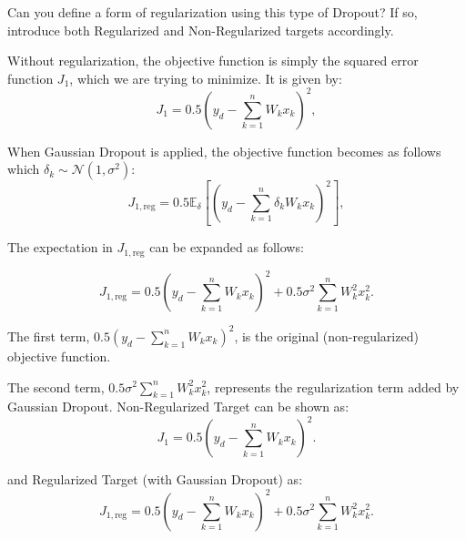 Can you define a form of regularization using this type of Dropout? If so, introduce both Regularized and Non-Regularized targets accordingly.
\begin{qsolve}
	\begin{qsolve}[]
		Without regularization, the objective function is simply the squared error function \( J_1 \), which we are trying to minimize. It is given by:
		\[
		J_1 = 0.5 \left( y_d - \sum_{k=1}^n W_k x_k \right)^2,
		\]
		
		When Gaussian Dropout is applied, the objective function becomes as follows which $\delta_k \sim \mathcal{N}(1, \sigma^2)$: 
		\[
		J_{1,\text{reg}} = 0.5 \mathbb{E}_{\delta} \left[ \left( y_d - \sum_{k=1}^n \delta_k W_k x_k \right)^2 \right],
		\]

		The expectation in \( J_{1,\text{reg}} \) can be expanded as follows:

		\[
		J_{1,\text{reg}} = 0.5 \left( y_d - \sum_{k=1}^n W_k x_k \right)^2 + 0.5 \sigma^2 \sum_{k=1}^n W_k^2 x_k^2.
		\]

		
		The first term, \( 0.5 \left( y_d - \sum_{k=1}^n W_k x_k \right)^2 \), is the original (non-regularized) objective function.
		
		The second term, \( 0.5 \sigma^2 \sum_{k=1}^n W_k^2 x_k^2 \), represents the regularization term added by Gaussian Dropout.
		Non-Regularized Target can be shown as:
		\[
		J_1 = 0.5 \left( y_d - \sum_{k=1}^n W_k x_k \right)^2.
		\]

		and Regularized Target (with Gaussian Dropout) as:
		\[
		J_{1,\text{reg}} = 0.5 \left( y_d - \sum_{k=1}^n W_k x_k \right)^2 + 0.5 \sigma^2 \sum_{k=1}^n W_k^2 x_k^2.
		\]
		

	\end{qsolve}
\end{qsolve}